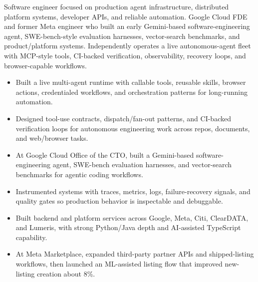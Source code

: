 


Software engineer focused on production agent infrastructure, distributed platform systems, developer APIs, and reliable automation. Google Cloud FDE and former Meta engineer who built an early Gemini-based software-engineering agent, SWE-bench-style evaluation harnesses, vector-search benchmarks, and product/platform systems. Independently operates a live autonomous-agent fleet with MCP-style tools, CI-backed verification, observability, recovery loops, and browser-capable workflows.
\begin{itemize}
  \item Built a live multi-agent runtime with callable tools, reusable skills, browser actions, credentialed workflows, and orchestration patterns for long-running automation.
  \item Designed tool-use contracts, dispatch/fan-out patterns, and CI-backed verification loops for autonomous engineering work across repos, documents, and web/browser tasks.
  \item At Google Cloud Office of the CTO, built a Gemini-based software-engineering agent, SWE-bench evaluation harnesses, and vector-search benchmarks for agentic coding workflows.
\end{itemize}
\begin{itemize}
  \item Instrumented systems with traces, metrics, logs, failure-recovery signals, and quality gates so production behavior is inspectable and debuggable.
  \item Built backend and platform services across Google, Meta, Citi, ClearDATA, and Lumeris, with strong Python/Java depth and AI-assisted TypeScript capability.
  \item At Meta Marketplace, expanded third-party partner APIs and shipped-listing workflows, then launched an ML-assisted listing flow that improved new-listing creation about 8\%.
\end{itemize}




